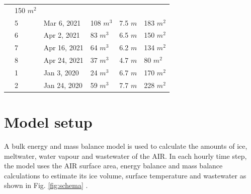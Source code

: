 \documentclass[utf8]{frontiersSCNS}
\begin{document}
\begin{table}
\begin{tabular}{@{}|llllll|@{}}
		                       & 150 $m^{2}$                                                                       \\
		\multicolumn{1}{|l|}{} & 5            & Mar 6, 2021   & 108 $m^{3}$     & 7.5 $m$
		                       & 183 $m^{2}$                                                                       \\
		\multicolumn{1}{|l|}{} & 6            & Apr 2, 2021   & 83 $m^{3}$      & 6.5 $m$
		                       & 150 $m^{2}$                                                                       \\
		\multicolumn{1}{|l|}{} & 7            & Apr 16, 2021  & 64 $m^{3}$      & 6.2 $m$
		                       & 134 $m^{2}$                                                                       \\
		\multicolumn{1}{|l|}{} & 8            & Apr 24, 2021  & 37 $m^{3}$      & 4.7 $m$
		                       & 80 $m^{2}$                                                                       \\
		\midrule
		\multicolumn{1}{|l|}{\multirow{2}{*}{\rotatebox[origin=c]{90}{CH20}}}
		                       & 1            & Jan 3, 2020   & 24 $m^{3}$      & 6.7 $m$
		                       & 170 $m^{2}$                                                                      \\
		\multicolumn{1}{|l|}{} & 2            & Jan 24, 2020  & 59 $m^{3}$      & 7.7 $m$
		                       & 228 $m^{2}$                                                                      \\
		\midrule
	\end{tabular}

\end{table}

\section{Model setup}

A bulk energy and mass balance model is used to calculate the amounts of ice, meltwater, water vapour and
wastewater of the AIR. In each hourly time step, the model uses the AIR surface area, energy balance and mass
balance calculations to estimate its ice volume, surface temperature and wastewater as shown in Fig.
\ref{fig:schema} .
\end{document}
